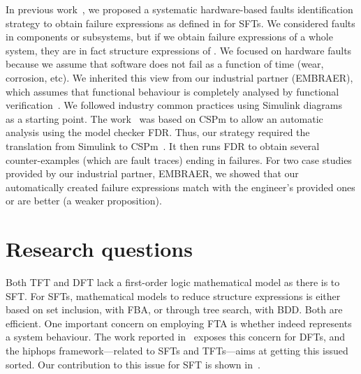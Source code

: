 \documentclass[12pt,openright,twoside,a4paper,oldfontcommands,english,brazil,draft]{abntex2}
\theoremstyle{theo}
\newcommand{\EMBRAER}{EMBRAER\xspace}
\newcommand{\simulink}{Simulink\xspace}
\begin{document}
In previous work~\cite{Didier2012,DM2012}, we proposed a systematic hardware-based faults identification strategy to obtain failure expressions as defined in  for \acp{SFT}.
We considered faults in components or subsystems, but if we obtain failure expressions of a whole system, they are in fact structure expressions of .
%
%
We focused on hardware faults because we assume that software does not fail as a function of time (wear, corrosion, etc).
%
We inherited this view from our industrial partner (\EMBRAER), which assumes that functional behaviour is completely analysed by functional verification~\cite{SP2011}.
%
We followed industry common practices using \simulink diagrams~\cite{Nise1992} as a starting point.
%
The work~\cite{DM2012} was based on \ac{CSPm} to allow an automatic analysis using the model checker \acs{FDR}.
%
Thus, our strategy required the translation from \simulink to \ac{CSPm}~\cite{JMS+2011}.
%
It then runs \acs{FDR} to obtain several counter-examples (which are fault traces) ending in failures.
%
For two case studies provided by our industrial partner, \EMBRAER, we showed that our automatically created failure expressions match with the engineer's provided ones or are better (a weaker proposition).

\section{Research questions}

Both \ac{TFT} and \ac{DFT} lack a first-order logic mathematical model as there is to \ac{SFT}.
For \acp{SFT}, mathematical models to reduce structure expressions is either based on set inclusion, with \ac{FBA}, or through tree search, with \ac{BDD}.
Both are efficient.
One important concern on employing \ac{FTA} is whether  indeed represents a system behaviour.
The work reported in~\cite{MCS+1999} exposes this concern for \acp{DFT}, and the \ac{hiphops} framework---related to \acp{SFT} and \acp{TFT}---aims at getting this issued sorted.
Our contribution to this issue for \ac{SFT} is shown in~\cite{DM2012,Didier2012}.
\end{document}

